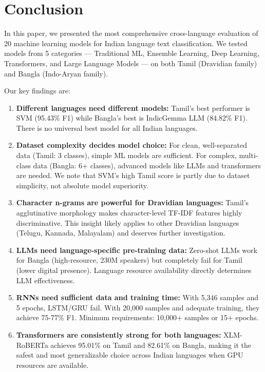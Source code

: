 \documentclass[conference]{IEEEtran}
\begin{document}
\section{Conclusion}

In this paper, we presented the most comprehensive cross-language evaluation of 20 machine learning models for Indian language text classification. We tested models from 5 categories --- Traditional ML, Ensemble Learning, Deep Learning, Transformers, and Large Language Models --- on both Tamil (Dravidian family) and Bangla (Indo-Aryan family).

Our key findings are:

\begin{enumerate}
\item \textbf{Different languages need different models:} Tamil's best performer is SVM (95.43\% F1) while Bangla's best is IndicGemma LLM (84.82\% F1). There is no universal best model for all Indian languages.

\item \textbf{Dataset complexity decides model choice:} For clean, well-separated data (Tamil: 3 classes), simple ML models are sufficient. For complex, multi-class data (Bangla: 6+ classes), advanced models like LLMs and transformers are needed. We note that SVM's high Tamil score is partly due to dataset simplicity, not absolute model superiority.

\item \textbf{Character n-grams are powerful for Dravidian languages:} Tamil's agglutinative morphology makes character-level TF-IDF features highly discriminative. This insight likely applies to other Dravidian languages (Telugu, Kannada, Malayalam) and deserves further investigation.

\item \textbf{LLMs need language-specific pre-training data:} Zero-shot LLMs work for Bangla (high-resource, 230M speakers) but completely fail for Tamil (lower digital presence). Language resource availability directly determines LLM effectiveness.

\item \textbf{RNNs need sufficient data and training time:} With 5,346 samples and 5 epochs, LSTM/GRU fail. With 20,000 samples and adequate training, they achieve 75-77\% F1. Minimum requirements: 10,000+ samples or 15+ epochs.

\item \textbf{Transformers are consistently strong for both languages:} XLM-RoBERTa achieves 95.01\% on Tamil and 82.61\% on Bangla, making it the safest and most generalizable choice across Indian languages when GPU resources are available.


\end{enumerate}
\end{document}
